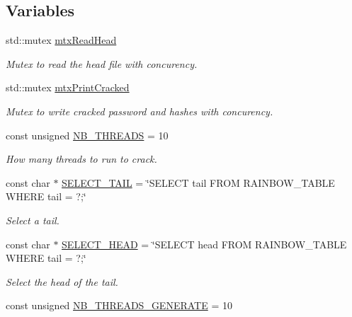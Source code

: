 \subsection*{Variables}
\begin{DoxyCompactItemize}
\item 
std\+::mutex \hyperlink{namespacebe_1_1esi_1_1secl_1_1pn_ad1391e7f8a94f1b945665f76d1965070}{mtx\+Read\+Head}
\begin{DoxyCompactList}\small\item\em Mutex to read the head file with concurency. \end{DoxyCompactList}\item 
std\+::mutex \hyperlink{namespacebe_1_1esi_1_1secl_1_1pn_a11fbbf54ca476439788d44d4d50512ab}{mtx\+Print\+Cracked}
\begin{DoxyCompactList}\small\item\em Mutex to write cracked password and hashes with concurency. \end{DoxyCompactList}\item 
const unsigned \hyperlink{namespacebe_1_1esi_1_1secl_1_1pn_a0bd77d0531142c20d01ec002cd3c210a}{N\+B\+\_\+\+T\+H\+R\+E\+A\+DS} = 10
\begin{DoxyCompactList}\small\item\em How many threads to run to crack. \end{DoxyCompactList}\item 
const char $\ast$ \hyperlink{namespacebe_1_1esi_1_1secl_1_1pn_a878205e4dbef8040fb12f6afb8717fa9}{S\+E\+L\+E\+C\+T\+\_\+\+T\+A\+IL} = \char`\"{}S\+E\+L\+E\+CT tail F\+R\+OM R\+A\+I\+N\+B\+O\+W\+\_\+\+T\+A\+B\+LE W\+H\+E\+RE tail = ?;\char`\"{}
\begin{DoxyCompactList}\small\item\em Select a tail. \end{DoxyCompactList}\item 
const char $\ast$ \hyperlink{namespacebe_1_1esi_1_1secl_1_1pn_a90db4018123c098c9cd9205b69c1d2e5}{S\+E\+L\+E\+C\+T\+\_\+\+H\+E\+AD} = \char`\"{}S\+E\+L\+E\+CT head F\+R\+OM R\+A\+I\+N\+B\+O\+W\+\_\+\+T\+A\+B\+LE W\+H\+E\+RE tail = ?;\char`\"{}
\begin{DoxyCompactList}\small\item\em Select the head of the tail. \end{DoxyCompactList}\item 
const unsigned \hyperlink{namespacebe_1_1esi_1_1secl_1_1pn_a6b1322df9a3137fe3dff27602a0dd390}{N\+B\+\_\+\+T\+H\+R\+E\+A\+D\+S\+\_\+\+G\+E\+N\+E\+R\+A\+TE} = 10

\end{DoxyCompactItemize}

